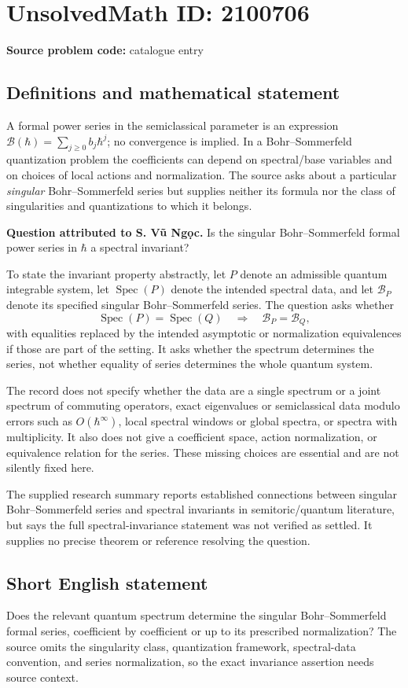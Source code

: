 \documentclass[11pt]{article}
\begin{document}
\section*{UnsolvedMath ID: 2100706}
\textbf{Source problem code:} catalogue entry
\subsection{Definitions and mathematical statement}
A formal power series in the semiclassical parameter is an expression $\mathcal B(\hbar)=\sum_{j\geq0}b_j\hbar^j$; no convergence is implied. In a Bohr--Sommerfeld quantization problem the coefficients can depend on spectral/base variables and on choices of local actions and normalization. The source asks about a particular \emph{singular} Bohr--Sommerfeld series but supplies neither its formula nor the class of singularities and quantizations to which it belongs.

\textbf{Question attributed to S. V\~u Ng\d{o}c.} Is the singular Bohr--Sommerfeld formal power series in $\hbar$ a spectral invariant?

To state the invariant property abstractly, let $P$ denote an admissible quantum integrable system, let $\operatorname{Spec}(P)$ denote the intended spectral data, and let $\mathcal B_P$ denote its specified singular Bohr--Sommerfeld series. The question asks whether
\[
 \operatorname{Spec}(P)=\operatorname{Spec}(Q)
 \quad\Longrightarrow\quad
 \mathcal B_P=\mathcal B_Q,
\]
with equalities replaced by the intended asymptotic or normalization equivalences if those are part of the setting. It asks whether the spectrum determines the series, not whether equality of series determines the whole quantum system.

The record does not specify whether the data are a single spectrum or a joint spectrum of commuting operators, exact eigenvalues or semiclassical data modulo errors such as $O(\hbar^\infty)$, local spectral windows or global spectra, or spectra with multiplicity. It also does not give a coefficient space, action normalization, or equivalence relation for the series. These missing choices are essential and are not silently fixed here.

The supplied research summary reports established connections between singular Bohr--Sommerfeld series and spectral invariants in semitoric/quantum literature, but says the full spectral-invariance statement was not verified as settled. It supplies no precise theorem or reference resolving the question.
\subsection{Short English statement}
Does the relevant quantum spectrum determine the singular Bohr--Sommerfeld formal series, coefficient by coefficient or up to its prescribed normalization? The source omits the singularity class, quantization framework, spectral-data convention, and series normalization, so the exact invariance assertion needs source context.
\end{document}
